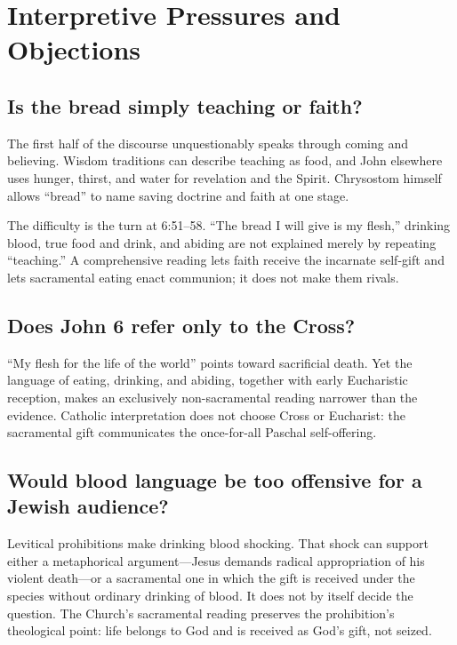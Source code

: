 \section{Interpretive Pressures and Objections}

\subsection{Is the bread simply teaching or faith?}

The first half of the discourse unquestionably speaks through coming and
believing. Wisdom traditions can describe teaching as food, and John elsewhere
uses hunger, thirst, and water for revelation and the Spirit. Chrysostom himself
allows ``bread'' to name saving doctrine and faith at one stage.

The difficulty is the turn at 6:51--58. ``The bread I will give is my flesh,''
drinking blood, true food and drink, and abiding are not explained merely by
repeating ``teaching.'' A comprehensive reading lets faith receive the incarnate
self-gift and lets sacramental eating enact communion; it does not make them
rivals.

\subsection{Does John 6 refer only to the Cross?}

``My flesh for the life of the world'' points toward sacrificial death. Yet the
language of eating, drinking, and abiding, together with early Eucharistic
reception, makes an exclusively non-sacramental reading narrower than the
evidence. Catholic interpretation does not choose Cross or Eucharist: the
sacramental gift communicates the once-for-all Paschal self-offering.

\subsection{Would blood language be too offensive for a Jewish audience?}

Levitical prohibitions make drinking blood shocking. That shock can support
either a metaphorical argument---Jesus demands radical appropriation of his
violent death---or a sacramental one in which the gift is received under the
species without ordinary drinking of blood. It does not by itself decide the
question. The Church's sacramental reading preserves the prohibition's
theological point: life belongs to God and is received as God's gift, not
seized.

